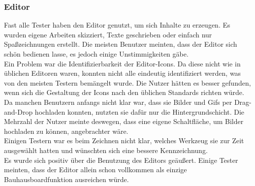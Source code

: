 

\subsubsection{Editor}\label{Editor}
Fast alle Tester haben den Editor genutzt, um sich Inhalte zu erzeugen.
Es wurden eigene Arbeiten skizziert, Texte geschrieben oder einfach nur Spaßzeichnungen erstellt.
Die meisten Benutzer meinten, dass der Editor sich schön bedienen lasse, es jedoch einige Unstimmigkeiten gäbe.
\\
Ein Problem war die Identifizierbarkeit der Editor-Icons.
Da diese nicht wie in üblichen Editoren waren, konnten nicht alle eindeutig identifiziert werden, was von den meisten Testern bemängelt wurde.
Die Nutzer hätten es besser gefunden, wenn sich die Gestaltung der Icons nach den üblichen Standards richten würde.
\\
Da manchen Benutzern anfangs nicht klar war, dass sie Bilder und Gifs per Drag-and-Drop hochladen konnten, nutzten sie dafür nur die Hintergrundschicht.
Die Mehrzahl der Nutzer meinte deswegen, dass eine eigene Schaltfläche, um Bilder hochladen zu können, angebrachter wäre.
\\
Einigen Testern war es beim Zeichnen nicht klar, welches Werkzeug sie zur Zeit ausgewählt hatten und wünschten sich eine bessere Kennzeichnung.
\\
Es wurde sich positiv über die Benutzung des Editors geäußert.
Einige Tester meinten, dass der Editor allein schon vollkommen als einzige Bauhausboardfunktion ausreichen würde.


